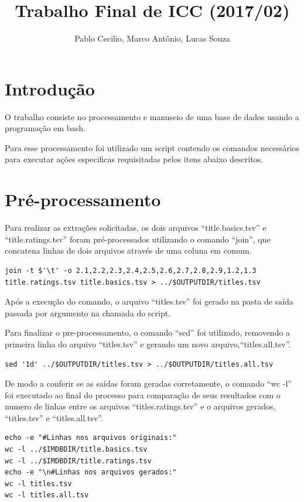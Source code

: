 \documentclass[12pt]{article}
\title{Trabalho Final de ICC (2017/02)}
\author{Pablo Cecilio, Marco Antônio, Lucas Souza}
\date{}
\begin{document}
\maketitle

\section{Introdução}

O trabalho consiste no processamento e manuseio de uma base de dados usando a programação em bash.

Para esse processamento foi utilizado um script contendo os comandos necessários para executar ações especificas requisitadas pelos itens abaixo descritos.

\section{Pré-processamento}

Para realizar as extrações solicitadas, os dois arquivos ``title.basics.tsv'' e ``title.ratings.tsv'' foram pré-processados utilizando o comando ``join'',  que concatena linhas de dois arquivos através de uma coluna em comum.

\begin{verbatim}
join -t $'\t' -o 2.1,2.2,2.3,2.4,2.5,2.6,2.7,2.8,2.9,1.2,1.3 title.ratings.tsv title.basics.tsv > ../$OUTPUTDIR/titles.tsv
\end{verbatim}

Após a execução do comando, o arquivo ``titles.tsv'' foi gerado na pasta de saída passada por argumento na chamada do script.

\pagebreak

Para finalizar o pre-processamento, o comando ``sed'' foi utilizado, removendo a primeira linha do arquivo ``titles.tsv'' e gerando um novo arquivo,``titles.all.tsv''. 

\begin{verbatim}
sed '1d' ../$OUTPUTDIR/titles.tsv > ../$OUTPUTDIR/titles.all.tsv
\end{verbatim}

De modo a conferir se as saídas foram geradas corretamente, o comando ``wc -l'' foi executado ao final do processo para comparação de seus resultados com o numero de linhas entre os arquivos ``titles.ratings.tsv'' e o arquivos gerados, ``titles.tsv'' e ``titles.all.tsv''.

\begin{verbatim}
echo -e "#Linhas nos arquivos originais:"
wc -l ../$IMDBDIR/title.basics.tsv
wc -l ../$IMDBDIR/title.ratings.tsv
echo -e "\n#Linhas nos arquivos gerados:"
wc -l titles.tsv
wc -l titles.all.tsv
\end{verbatim}
\end{document}

